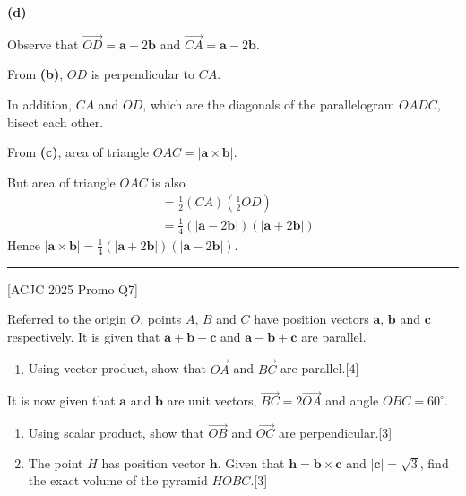 \documentclass[a4paper,11pt,oneside]{book}
\newcounter{wq}[section]
\newcommand{\Q}[1]{\par\needspace{5\baselineskip}\medskip\stepcounter{wq}\noindent\textbf{\thewq}\quad #1\par}
\begin{document}
\par\smallskip\noindent\textbf{(d)}\par\nopagebreak{}Observe that $\overrightarrow{OD}=\mathbf a+2\mathbf b$ and $\overrightarrow{CA}=\mathbf a-2\mathbf b$.\par From \textbf{(b)}, $OD$ is perpendicular to $CA$.\par In addition, $CA$ and $OD$, which are the diagonals of the parallelogram $OADC$, bisect each other.\begin{center}\end{center}From \textbf{(c)}, area of triangle $OAC=|\mathbf a\times\mathbf b|$.\par But area of triangle $OAC$ is also\begin{align*}&=\tfrac12(CA)\left(\tfrac12OD\right)\\ &=\tfrac14\left(|\mathbf a-2\mathbf b|\right)\left(|\mathbf a+2\mathbf b|\right)\end{align*}Hence $|\mathbf a\times\mathbf b|=\frac14\left(|\mathbf a+2\mathbf b|\right)\left(|\mathbf a-2\mathbf b|\right)$.
\par\medskip\hrule\medskip
\Q{\textcolor{black!60}{\small[ACJC 2025 Promo Q7]}\par\smallskip Referred to the origin $O$, points $A$, $B$ and $C$ have position vectors $\mathbf a$, $\mathbf b$ and $\mathbf c$ respectively. It is given that $\mathbf a+\mathbf b-\mathbf c$ and $\mathbf a-\mathbf b+\mathbf c$ are parallel.\begin{enumerate}[label=\textbf{(\alph*)},leftmargin=2.2em,itemsep=3pt]\item Using vector product, show that $\overrightarrow{OA}$ and $\overrightarrow{BC}$ are parallel.\hfill[4]\end{enumerate}It is now given that $\mathbf a$ and $\mathbf b$ are unit vectors, $\overrightarrow{BC}=2\overrightarrow{OA}$ and angle $OBC=60^\circ$.\begin{enumerate}[label=\textbf{(\alph*)},leftmargin=2.2em,itemsep=3pt,start=2]\item Using scalar product, show that $\overrightarrow{OB}$ and $\overrightarrow{OC}$ are perpendicular.\hfill[3]\item The point $H$ has position vector $\mathbf h$. Given that $\mathbf h=\mathbf b\times\mathbf c$ and $|\mathbf c|=\sqrt3$, find the exact volume of the pyramid $HOBC$.\hfill[3]\par[The volume of a pyramid is $\frac13\times$ base area $\times$ height.]\end{enumerate}}
\end{document}
